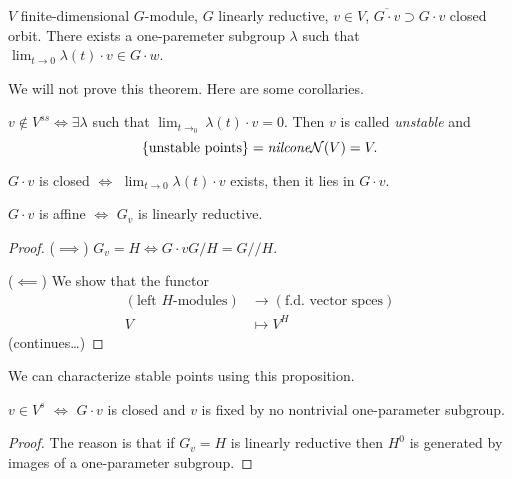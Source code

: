 \begin{theorem}
\label{theorem-Hilbert-Mumford-criterion}
$V$ finite-dimensional $G$-module, $G$ linearly reductive, $v \in V$,
$\overline{G\cdot v}\supset G\cdot v$ closed orbit. There exists a one-paremeter
subgroup $\lambda$ such that $\lim_{t \to 0} \lambda(t)\cdot v \in G\cdot w$.
\end{theorem}

We will not prove this theorem. Here are some corollaries.

\begin{lemma}
\label{lemma-unstable}
$v \not \in V^{ss} \iff \exists  \lambda$ such that 
$\lim_{t\to_0}\lambda(t)\cdot v =0$. Then $v$ is called {\it unstable} and 
$$
\{\text{unstable points}\}=\text{{\it nilcone}} \mathcal{N}(V)=V.
$$
\end{lemma}

\begin{lemma}
\label{lemma-orbit-is-closed-iff-limit-lies-in-orbit}
$G\cdot v$ is closed $\iff$ $\lim_{t \to 0} \lambda(t)\cdot v$ exists, then it
lies in $G\cdot v$.
\end{lemma}

\begin{proposition}
\label{proposition-orbit-is-affine-iff-stabilizer-is-linearly-reductive}
$G\cdot v$ is affine $\iff$ $G_v$ is linearly reductive.
\end{proposition}

\begin{proof}
($\implies$) $G_v = H \iff G\cdot v G/H=G/\!/H$.

($\impliedby$) We show that the functor
\begin{align*}
(\text{left $H$-modules}) &\longrightarrow (\text{f.d. vector spces}) \\
V &\longmapsto V^H
\end{align*}
(continues…)
\end{proof}

We can characterize stable points using this proposition.

\begin{lemma}
\label{lemma-stable-point-iff-orbit-is-closed-and-not-fixed-by-nontrivial-1PS}
$v \in V^s$ $\iff$ $G\cdot v$ is closed and $v$ is fixed by no nontrivial
one-parameter subgroup.
\end{lemma}

\begin{proof}
The reason is that if $G_v=H$ is linearly reductive then $H^0$ is generated by
images of a one-parameter subgroup.
\end{proof}


